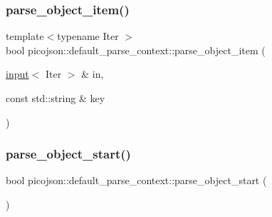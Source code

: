 \hypertarget{classpicojson_1_1default__parse__context_adf71929b098e4f4b5c32222af149655a}{}\label{classpicojson_1_1default__parse__context_adf71929b098e4f4b5c32222af149655a} 
\subsubsection{\texorpdfstring{parse\+\_\+object\+\_\+item()}{parse\_object\_item()}}
{\footnotesize\ttfamily template$<$typename Iter $>$ \\
bool picojson\+::default\+\_\+parse\+\_\+context\+::parse\+\_\+object\+\_\+item (\begin{DoxyParamCaption}\item[{\hyperlink{classpicojson_1_1input}{input}$<$ Iter $>$ \&}]{in,  }\item[{const std\+::string \&}]{key }\end{DoxyParamCaption})\hspace{0.3cm}{\ttfamily [inline]}}

\hypertarget{classpicojson_1_1default__parse__context_a54eba00b93ce4cdaf8b2acac4ef3e046}{}\label{classpicojson_1_1default__parse__context_a54eba00b93ce4cdaf8b2acac4ef3e046} 
\subsubsection{\texorpdfstring{parse\+\_\+object\+\_\+start()}{parse\_object\_start()}}
{\footnotesize\ttfamily bool picojson\+::default\+\_\+parse\+\_\+context\+::parse\+\_\+object\+\_\+start (\begin{DoxyParamCaption}{ }\end{DoxyParamCaption})\hspace{0.3cm}{\ttfamily [inline]}}

\hypertarget{classpicojson_1_1default__parse__context_a476c7d30a5cf382b48201ec64585c2f3}{}\label{classpicojson_1_1default__parse__context_a476c7d30a5cf382b48201ec64585c2f3} 
